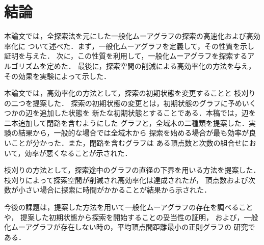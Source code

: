 
\chapter{結論}
本論文では，全探索法を元にした一般化ムーアグラフの探索の高速化および高効率化に
ついて述べた．まず，一般化ムーアグラフを定義して，その性質を示し証明を与えた．
次に，この性質を利用して，一般化ムーアグラフを探索するアルゴリズムを定めた．
最後に，探索空間の削減による高効率化の方法を与え，その効果を実験によって示した．

本論文では，高効率化の方法として，探索の初期状態を変更することと
枝刈りの二つを提案した．
探索の初期状態の変更とは，初期状態のグラフに予めいくつかの辺を追加した状態を
新たな初期状態とすることである．本稿では，辺を二本追加して閉路を含むようにした
グラフと，全域木の二種類を提案した．実験の結果から，一般的な場合では全域木から
探索を始める場合が最も効率が良いことが分かった．また，閉路を含むグラフは
ある頂点数と次数の組合せにおいて，効率が悪くなることが示された．

枝刈りの方法として，探索途中のグラフの直径の下界を用いる方法を提案した．
枝刈りによって探索空間が削減され高効率化は達成されたが，
頂点数および次数が小さい場合に探索に時間がかかることが結果から示された．

今後の課題は，提案した方法を用いて一般化ムーアグラフの存在を調べることや，
提案した初期状態から探索を開始することの妥当性の証明，
および，一般化ムーアグラフが存在しない時の，平均頂点間距離最小の正則グラフの
研究である．

